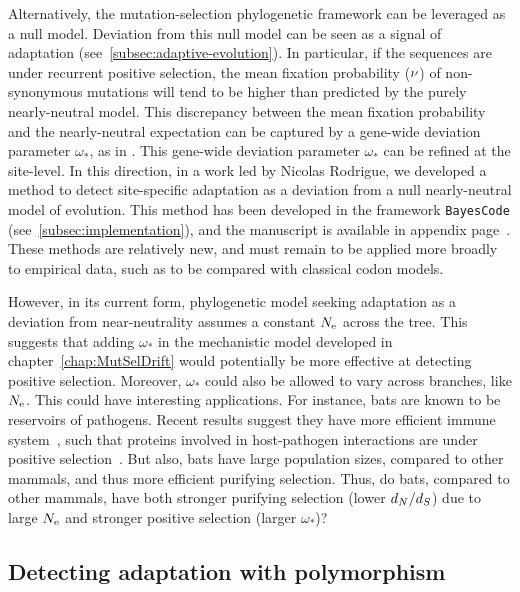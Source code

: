 Alternatively, the mutation-selection phylogenetic framework can be leveraged as a null model.
Deviation from this null model can be seen as a signal of adaptation (see~\ref{subsec:adaptive-evolution}).
In particular, if the sequences are under recurrent positive selection, the mean fixation probability ($\nu$) of non-synonymous mutations will tend to be higher than predicted by the purely nearly-neutral model.
This discrepancy between the mean fixation probability and the nearly-neutral expectation can be captured by a gene-wide deviation parameter $\omega_*$, as in \citet{Rodrigue2016}.
This gene-wide deviation parameter $\omega_*$ can be refined at the site-level.
In this direction, in a work led by Nicolas Rodrigue, we developed a method to detect site-specific adaptation as a deviation from a null nearly-neutral model of evolution.
This method has been developed in the framework \texttt{\texttt{BayesCode}} (see~\ref{subsec:implementation}), and the manuscript is available in appendix page~\pageref{sec-appendix:MutSelM3starMBE}.
These methods are relatively new, and must remain to be applied more broadly to empirical data, such as to be compared with classical codon models.

However, in its current form, phylogenetic model seeking adaptation as a deviation from near-neutrality assumes a constant $N_{\textrm{e}}$ across the tree.
This suggests that adding $\omega_*$ in the mechanistic model developed in chapter~\ref{chap:MutSelDrift} would potentially be more effective at detecting positive selection.
Moreover, $\omega_*$ could also be allowed to vary across branches, like $N_{\textrm{e}}$.
This could have interesting applications.
For instance, bats are known to be reservoirs of pathogens.
Recent results suggest they have more efficient immune system~\citep{Baker2013,Pavlovich2018}, such that proteins involved in host-pathogen interactions are under positive selection~\citep{Hawkins2019,Vandewege2020}.
But also, bats have large population sizes, compared to other mammals, and thus more efficient purifying selection.
Thus, do bats, compared to other mammals, have both stronger purifying selection (lower $d_N / d_S$) due to large $N_{\textrm{e}}$ and stronger positive selection (larger $\omega_*$)?

\subsection{Detecting adaptation with polymorphism}
\label{subsec:detecting-adaptation-with-polymorphism}

